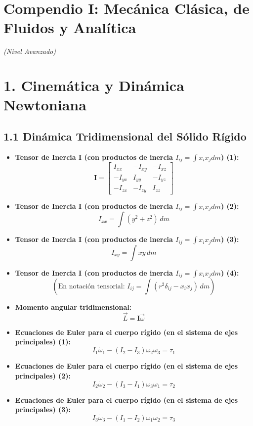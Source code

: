 \documentclass[11pt,a4paper]{article}
\begin{document}
\section*{Compendio I: Mecánica Clásica, de Fluidos y Analítica}

\textit{(Nivel Avanzado)}

\section*{1. Cinemática y Dinámica Newtoniana}

\subsection*{1.1 Dinámica Tridimensional del Sólido Rígido}

\begin{itemize}
  \item \textbf{Tensor de Inercia $\mathbf{I}$ (con productos de inercia $I_{ij} = \int x_i x_j dm$) (1):}
  \[
    \mathbf{I} = \begin{bmatrix} I_{xx} & -I_{xy} & -I_{xz} \\ -I_{yx} & I_{yy} & -I_{yz} \\ -I_{zx} & -I_{zy} & I_{zz} \end{bmatrix}
  \]
  \item \textbf{Tensor de Inercia $\mathbf{I}$ (con productos de inercia $I_{ij} = \int x_i x_j dm$) (2):}
  \[
    I_{xx} = \int (y^2 + z^2) \, dm
  \]
  \item \textbf{Tensor de Inercia $\mathbf{I}$ (con productos de inercia $I_{ij} = \int x_i x_j dm$) (3):}
  \[
    I_{xy} = \int xy \, dm
  \]
  \item \textbf{Tensor de Inercia $\mathbf{I}$ (con productos de inercia $I_{ij} = \int x_i x_j dm$) (4):}
  \[
    \left( \text{En notación tensorial: } I_{ij} = \int (r^2 \delta_{ij} - x_i x_j) \, dm \right)
  \]
  \item \textbf{Momento angular tridimensional:}
  \[
    \vec{L} = \mathbf{I} \vec{\omega}
  \]
  \item \textbf{Ecuaciones de Euler para el cuerpo rígido (en el sistema de ejes principales) (1):}
  \[
    I_1 \dot{\omega}_1 - (I_2 - I_3)\omega_2 \omega_3 = \tau_1
  \]
  \item \textbf{Ecuaciones de Euler para el cuerpo rígido (en el sistema de ejes principales) (2):}
  \[
    I_2 \dot{\omega}_2 - (I_3 - I_1)\omega_3 \omega_1 = \tau_2
  \]
  \item \textbf{Ecuaciones de Euler para el cuerpo rígido (en el sistema de ejes principales) (3):}
  \[
    I_3 \dot{\omega}_3 - (I_1 - I_2)\omega_1 \omega_2 = \tau_3
  \]
\end{itemize}
\end{document}
